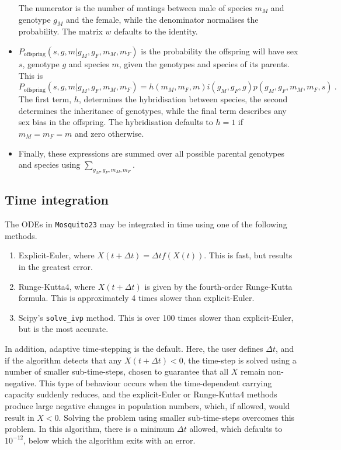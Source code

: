 \documentclass[11pt,a4paper]{article}
\begin{document}
\begin{itemize}
\begin{equation}
\end{equation}
The numerator is the number of matings between male of species $m_{M}$ and genotype $g_{M}$ and the female, while the denominator normalises the probability.  The matrix $w$ defaults to the identity.
\item $P_{\mathrm{offspring}}(s, g, m | g_{M}, g_{F}, m_{M}, m_{F})$ is the probability the offspring will have sex $s$, genotype $g$ and species $m$, given the genotypes and species of its parents.  This is
\begin{equation}
P_{\mathrm{offspring}}(s, g, m | g_{M}, g_{F}, m_{M}, m_{F}) = h(m_{M}, m_{F}, m)i(g_{M}, g_{F}, g)p(g_{M}, g_{F}, m_{M}, m_{F}, s) \ .
\end{equation}
The first term, $h$, determines the hybridisation between species, the second determines the inheritance of genotypes, while the final term describes any sex bias in the offspring.  The hybridisation defaults to $h=1$ if $m_{M}=m_{F}=m$ and zero otherwise.  
\item Finally, these expressions are summed over all possible parental genotypes and species using $\sum_{g_{M}, g_{F}, m_{M}, m_{F}}$.
\end{itemize}

\subsection{Time integration}

The ODEs in {\tt Mosquito23} may be integrated in time using one of the following methods.
\begin{enumerate}
\item Explicit-Euler, where $X(t + \Delta t) = \Delta t f(X(t))$.  This is fast, but results in the greatest error.
\item Runge-Kutta4, where $X(t + \Delta t)$ is given by the fourth-order Runge-Kutta formula.  This is approximately 4 times slower than explicit-Euler.
\item Scipy's {\tt solve\_ivp} method.  This is over 100 times slower than explicit-Euler, but is the most accurate.
\end{enumerate}

In addition, adaptive time-stepping is the default.  Here, the user defines $\Delta t$, and if the algorithm detects that any $X(t + \Delta t) < 0$, the time-step is solved using a number of smaller sub-time-steps, chosen to guarantee that all $X$ remain non-negative.  This type of behaviour occurs when the time-dependent carrying capacity suddenly reduces, and the explicit-Euler or Runge-Kutta4 methods produce large negative changes in population numbers, which, if allowed, would result in $X<0$.  Solving the problem using smaller sub-time-steps overcomes this problem.  In this algorithm, there is a minimum $\Delta t$ allowed, which defaults to $10^{-12}$, below which the algorithm exits with an error.
\end{document}
